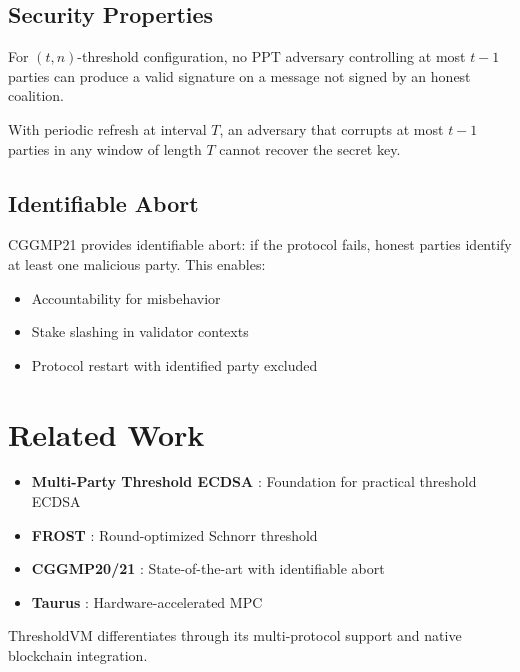 \documentclass[11pt,twocolumn]{article}
\begin{document}
\subsection{Security Properties}

\begin{theorem}
For $(t,n)$-threshold configuration, no PPT adversary controlling at most $t-1$ parties can produce a valid signature on a message not signed by an honest coalition.
\end{theorem}

\begin{theorem}
With periodic refresh at interval $T$, an adversary that corrupts at most $t-1$ parties in any window of length $T$ cannot recover the secret key.
\end{theorem}

\subsection{Identifiable Abort}

CGGMP21 provides identifiable abort: if the protocol fails, honest parties identify at least one malicious party. This enables:
\begin{itemize}
\item Accountability for misbehavior
\item Stake slashing in validator contexts
\item Protocol restart with identified party excluded
\end{itemize}

\section{Related Work}

\begin{itemize}
\item \textbf{Multi-Party Threshold ECDSA} \cite{gennaro2018fast}: Foundation for practical threshold ECDSA
\item \textbf{FROST} \cite{frost}: Round-optimized Schnorr threshold
\item \textbf{CGGMP20/21} \cite{cggmp21}: State-of-the-art with identifiable abort
\item \textbf{Taurus} \cite{taurus}: Hardware-accelerated MPC
\end{itemize}

ThresholdVM differentiates through its multi-protocol support and native blockchain integration.
\end{document}

